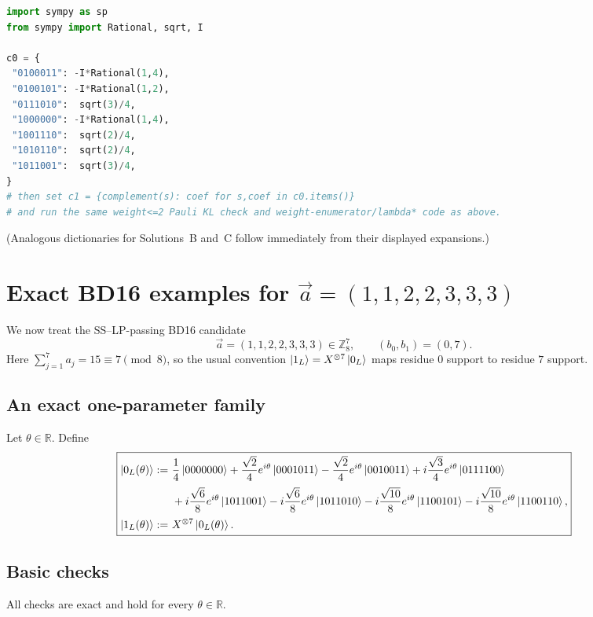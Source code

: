 \documentclass[11pt]{article}
\begin{document}
\begin{lstlisting}[language=Python]
import sympy as sp
from sympy import Rational, sqrt, I

c0 = {
 "0100011": -I*Rational(1,4),
 "0100101": -I*Rational(1,2),
 "0111010":  sqrt(3)/4,
 "1000000": -I*Rational(1,4),
 "1001110":  sqrt(2)/4,
 "1010110":  sqrt(2)/4,
 "1011001":  sqrt(3)/4,
}
# then set c1 = {complement(s): coef for s,coef in c0.items()}
# and run the same weight<=2 Pauli KL check and weight-enumerator/lambda* code as above.
\end{lstlisting}

(Analogous dictionaries for Solutions~B and~C follow immediately from their displayed expansions.)

\section{Exact BD16 examples for \texorpdfstring{$\vec a=(1,1,2,2,3,3,3)$}{a=(1,1,2,2,3,3,3)}}
\label{sec:bd16_1122333}

We now treat the SS--LP-passing BD16 candidate
\[
\vec a=(1,1,2,2,3,3,3)\in\mathbb{Z}_8^7,\qquad (b_0,b_1)=(0,7).
\]
Here \(\sum_{j=1}^7 a_j=15\equiv 7\pmod 8\), so the usual convention \(\ket{1_L}=X^{\otimes 7}\ket{0_L}\) maps residue \(0\) support to residue \(7\) support.

\subsection{An exact one-parameter family}

Let \(\theta\in\mathbb{R}\). Define
\[
\boxed{
\begin{aligned}
\ket{0_L(\theta)} :=
&\ \frac{1}{4}\ket{0000000}
+\frac{\sqrt2}{4}e^{i\theta}\ket{0001011}
-\frac{\sqrt2}{4}e^{i\theta}\ket{0010011}
+i\frac{\sqrt3}{4}e^{i\theta}\ket{0111100}\\[2pt]
&\ +i\frac{\sqrt6}{8}e^{i\theta}\ket{1011001}
-i\frac{\sqrt6}{8}e^{i\theta}\ket{1011010}
-i\frac{\sqrt{10}}{8}e^{i\theta}\ket{1100101}
-i\frac{\sqrt{10}}{8}e^{i\theta}\ket{1100110},
\\[2pt]
\ket{1_L(\theta)} :=&\ X^{\otimes 7}\ket{0_L(\theta)}.
\end{aligned}
}
\]

\subsection{Basic checks}

All checks are exact and hold for every \(\theta\in\mathbb{R}\).
\end{document}
